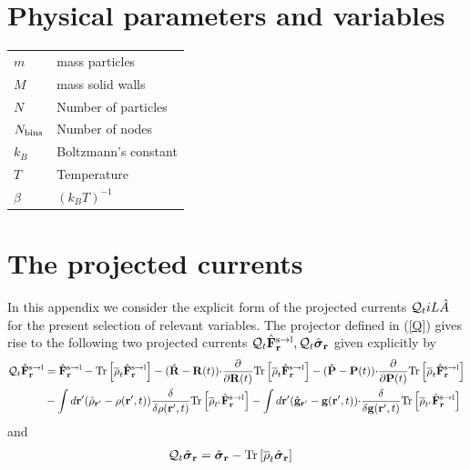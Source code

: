 \documentclass[b5paper,openright,11pt]{book}
\begin{document}
\begin{appendices}
\chapter{Physical parameters and variables}
\begin{tabular}{l l}
    $m$ & mass particles \\
    $M$ & mass solid walls \\
    $N$ & Number of particles \\
    $N_{\rm bins}$ & Number of nodes \\
    $k_B$ & Boltzmann's constant \\
    $T$ & Temperature \\
    $\beta$ & $(k_BT)^{-1}$ \\
\end{tabular}


\chapter{The projected currents}
\label{Ap:Projected}
In  this appendix  we  consider  the explicit  form  of the  projected
currents  ${\cal  Q}_tiL\hat{A}$  for  the  present  selection  of  relevant
variables.   The projector  defined  in (\ref{Q})  gives  rise to  the
following  two projected  currents  ${\cal  Q}_t\hat{\bf F}^{\rm  s\to
  l}_{{\bf r}},  {\cal Q}_t\hat{\boldsymbol{\sigma}}_{{\bf  r}}$ given
explicitly by
\begin{align}
  {\cal Q}_t\hat{\bf F}^{\rm s\to l}_{{\bf r}}&=
\hat{\bf F}^{\rm s\to l}_{{\bf r}}- {\rm Tr}\left[\overline{\rho}_{t} \hat{\bf F}^{\rm s\to l}_{{\bf r}}\right]
-(\hat{\bf R}-{\bf R}(t)){\cdot}\frac{\partial}{\partial {\bf R}(t)}
{\rm Tr}\left[\overline{\rho}_{t} \hat{\bf F}^{\rm s\to l}_{{\bf r}}\right]
-(\hat{\bf P}-{\bf P}(t)){\cdot}\frac{\partial}{\partial {\bf P}(t)}
{\rm Tr}\left[\overline{\rho}_{t} \hat{\bf F}^{\rm s\to l}_{{\bf r}}\right]
\nonumber\\
&-\int d{\bf r}'(\hat{\rho}_{{\bf r}'}-\rho({\bf r}',t))
\frac{\delta}{\delta \rho({\bf r}',t)}{\rm Tr}\left[\overline{\rho}_{t'}  \hat{\bf F}^{\rm s\to l}_{{\bf r}}\right]
-\int d{\bf r}'(\hat{\bf g}_{{\bf r}'}-{\bf g}({\bf r}',t))
{\cdot}\frac{\delta}{\delta {\bf g}({\bf r}',t)}{\rm Tr}\left[\overline{\rho}_{t'}  \hat{\bf F}^{\rm s\to l}_{{\bf r}}\right]
\label{QF0}
\end{align}
and 
\begin{align}
  {\cal Q}_t\hat{\boldsymbol{\sigma}}_{{\bf r}}&=
\hat{\boldsymbol{\sigma}}_{{\bf r}}- {\rm Tr}\left[\overline{\rho}_{t} \hat{\boldsymbol{\sigma}}_{{\bf r}}\right]

\end{align}
\end{appendices}
\end{document}
